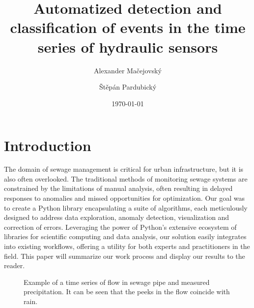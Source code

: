 \documentclass[12pt,a4paper]{article}
\title{Automatized detection and classification of events in the time series of hydraulic sensors}
\author{Alexander Ma\v{c}ejovsk\'{y} \and \v{S}t\v{e}p\'{a}n Pardubick\'{y}}
\date{\today}
\begin{document}

\maketitle %

\thispagestyle{empty} %

\clearpage %

\tableofcontents  

\newpage



\section{Introduction}


The domain of sewage management is critical for urban infrastructure, but it is also often overlooked.
The traditional methods of monitoring sewage systems are constrained by the limitations of manual analysis, often resulting in delayed responses to anomalies and missed opportunities for optimization.
Our goal was to create a Python library encapsulating a suite of algorithms, each meticulously designed to address data exploration, anomaly detection, visualization and correction of errors. Leveraging the power of Python's extensive ecosystem of libraries for scientific computing and data analysis, our solution easily integrates into existing workflows, offering a utility for both experts and practitioners in the field. This paper will summarize our work process and display our results to the reader.

\begin{figure}[ht]
  \noindent{}
  \caption{Example of a time series of flow in sewage pipe and measured precipitation. It can be seen that the peeks in the flow coincide with rain.}
    \label{rain_data}
\end{figure}
\end{document}

